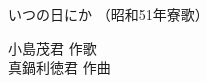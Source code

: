 \documentclass[10pt,b5j]{tarticle} %
\begin{document}
\begin{minipage}[c]{0.7\hsize} %
    \begin{center}
        {\LARGE
            いつの日にか %
        }
        {\small 
            （昭和51年寮歌） %
        }
    \end{center}
\end{minipage}
\begin{minipage}[c]{0.3\hsize} %
    \begin{flushright} %
        小島茂君 作歌\\真鍋利徳君 作曲 %
    \end{flushright}
\end{minipage}
\end{document}
